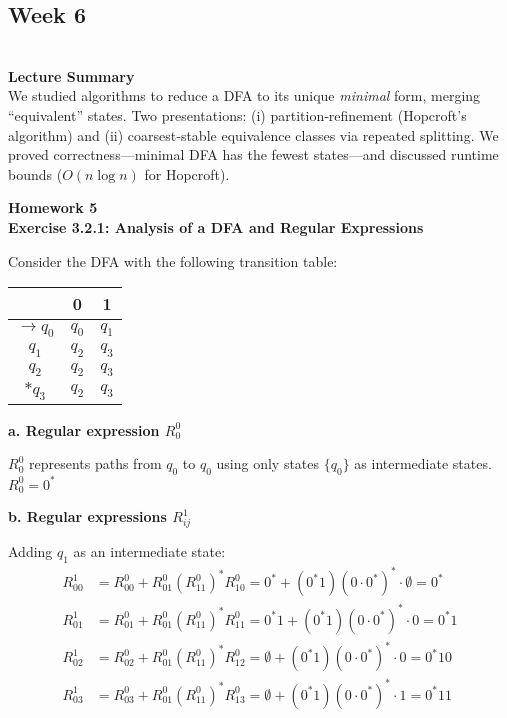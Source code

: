 \documentclass{article}
\theoremstyle{theorem}
\theoremstyle{definition}
\theoremstyle{remark}
\begin{document}



\subsection{Week 6}\\
\textbf{Lecture Summary}\\
We studied algorithms to reduce a DFA to its unique \emph{minimal} form, merging “equivalent” states.  Two presentations: (i) partition‐refinement (Hopcroft’s algorithm) and (ii) coarsest‐stable equivalence classes via repeated splitting.  We proved correctness—minimal DFA has the fewest states—and discussed runtime bounds ($O(n\log n)$ for Hopcroft).


\textbf{Homework 5}\\
\textbf{Exercise 3.2.1: Analysis of a DFA and Regular Expressions}

Consider the DFA with the following transition table:
\begin{center}
\begin{tabular}{c|cc}
 & 0 & 1 \\ \hline
$\to q_0$ & $q_0$ & $q_1$ \\
$q_1$ & $q_2$ & $q_3$ \\
$q_2$ & $q_2$ & $q_3$ \\
$*q_3$ & $q_2$ & $q_3$ \\
\end{tabular}
\end{center}

\textbf{a. Regular expression $R^0_0$}

$R^0_0$ represents paths from $q_0$ to $q_0$ using only states $\{q_0\}$ as intermediate states.
$R^0_0 = 0^*$

\textbf{b. Regular expressions $R^1_{ij}$}

Adding $q_1$ as an intermediate state:
\begin{align*}
R^1_{00} &= R^0_{00} + R^0_{01}(R^0_{11})^*R^0_{10} = 0^* + (0^*1)(0 \cdot 0^*)^* \cdot \emptyset = 0^* \\
R^1_{01} &= R^0_{01} + R^0_{01}(R^0_{11})^*R^0_{11} = 0^*1 + (0^*1)(0 \cdot 0^*)^* \cdot 0 = 0^*1 \\
R^1_{02} &= R^0_{02} + R^0_{01}(R^0_{11})^*R^0_{12} = \emptyset + (0^*1)(0 \cdot 0^*)^* \cdot 0 = 0^*10 \\
R^1_{03} &= R^0_{03} + R^0_{01}(R^0_{11})^*R^0_{13} = \emptyset + (0^*1)(0 \cdot 0^*)^* \cdot 1 = 0^*11 \\
\end{align*}
\end{document}

